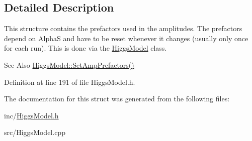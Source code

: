 \subsection{Detailed Description}
This structure contains the prefactors used in the amplitudes. The prefactors depend on Alpha\-S and have to be reset whenever it changes (usually only once for each run). This is done via the \hyperlink{classHiggsModel}{Higgs\-Model} class. \begin{DoxySeeAlso}{See Also}
\hyperlink{classHiggsModel_a514e3dd7854409c622b8e200fe2ee84c}{Higgs\-Model\-::\-Set\-Amp\-Prefactors()} 
\end{DoxySeeAlso}


Definition at line 191 of file Higgs\-Model.\-h.



The documentation for this struct was generated from the following files\-:\begin{DoxyCompactItemize}
\item 
inc/\hyperlink{HiggsModel_8h}{Higgs\-Model.\-h}\item 
src/Higgs\-Model.\-cpp\end{DoxyCompactItemize}
